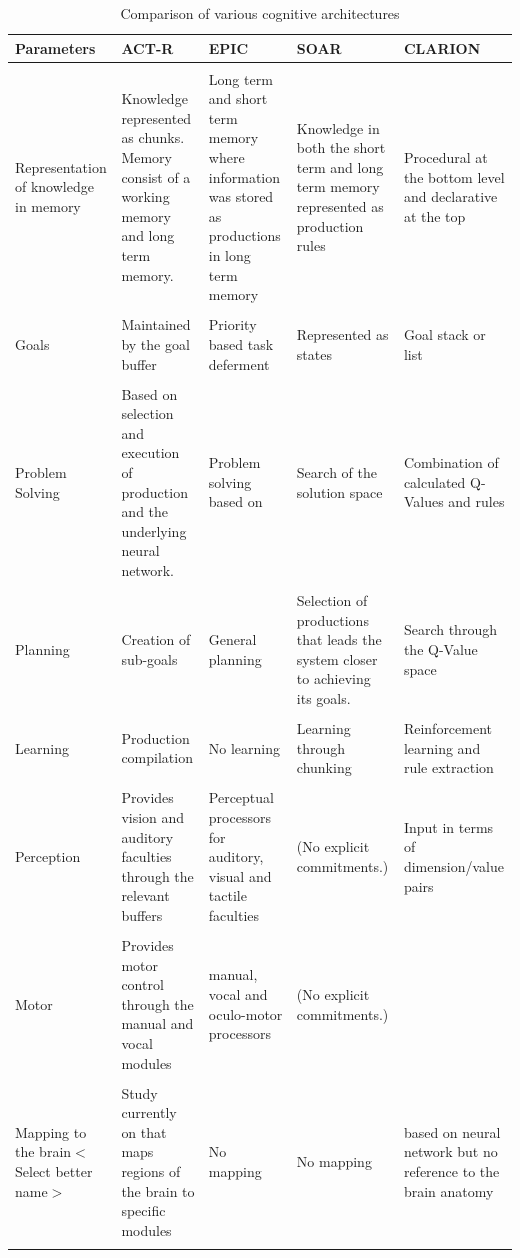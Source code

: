 \begin{table}
  \centering
\caption{Comparison of various cognitive architectures}
\label{tab:architecture-comparison}
  \begin{tabular}{p{3cm}p{4cm}p{4cm}p{4cm}p{4cm}}
  \hline
  Parameters & ACT-R & EPIC & SOAR & CLARION \\
  \hline
  & & & &\\
  Representation of knowledge in memory & Knowledge represented as chunks. Memory consist of a
  working memory and long term memory.& Long term and short term
  memory where information was stored as productions in long term
  memory & Knowledge in both the short term and long term memory
  represented as production rules& Procedural at the bottom level and
  declarative at the top  \\
  & & & &\\
  Goals  & Maintained by the goal buffer & Priority based task
  deferment~\cite{Pew:1998aa}& Represented as states & Goal stack or list \\
  & & & &\\
  Problem Solving  & Based on selection and execution of production
  and the underlying neural network.& Problem solving based on &Search
  of the solution space& Combination of calculated Q-Values and rules\\
  & & & &\\
  Planning  & Creation of sub-goals&General planning & Selection of
  productions that leads the system closer to achieving its
  goals. &Search through the Q-Value space \\
  & & & &\\
  Learning   & Production compilation&No learning & Learning through
  chunking & Reinforcement learning and rule extraction \\
  & & & &\\
  Perception & Provides vision and auditory faculties through the
  relevant buffers& Perceptual processors for auditory, visual and
  tactile faculties & (No explicit commitments.) & Input in terms of dimension/value pairs\\
  & & & &\\
  Motor & Provides motor control through the manual and vocal modules&
  manual, vocal and oculo-motor processors
  & (No explicit commitments.) &\\
  & & & &\\
  Mapping to the brain$<$Select better name$>$ & Study currently on
  that maps regions of the brain to specific modules& No mapping& No
  mapping& based on neural network but no reference to the brain anatomy\cite{Chong:2007aa} \\
  & & & &\\

\end{tabular}
\end{table}

